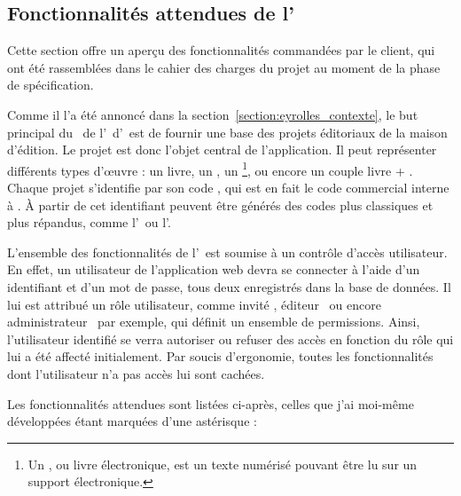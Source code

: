 \subsection{Fonctionnalités attendues de l'\aintranet}
\label{section:eyrolles_fct}

Cette section offre un aperçu des fonctionnalités commandées par le client, qui ont été rassemblées dans le cahier des charges du projet au moment de la phase de spécification.

Comme il l'a été annoncé dans la section~\ref{section:eyrolles_contexte}, le but principal du \alotdeux\ de l'\aintranet\ d'\aey\ est de fournir une base des projets éditoriaux de la maison d'édition. Le projet est donc l'objet central de l'application. Il peut représenter différents types d'œuvre : un livre, un \advd, un \aebook\footnote{Un \aebook, ou livre électronique, est un texte numérisé pouvant être lu sur un support électronique.\cite{ebook}}, ou encore un couple livre + \aebook. Chaque projet s'identifie par son code \ageodif, qui est en fait le code commercial interne à \aey. À partir de cet identifiant peuvent être générés des codes plus classiques et plus répandus, comme l'\aisbn\ ou l'\aean.

L'ensemble des fonctionnalités de l'\aintranet\ est soumise à un contrôle d'accès utilisateur. En effet, un utilisateur de l'application web devra se connecter à l'aide d'un identifiant et d'un mot de passe, tous deux enregistrés dans la base de données. Il lui est attribué un rôle utilisateur, comme \og invité \fg, \og éditeur \fg\ ou encore \og administrateur \fg\ par exemple, qui définit un ensemble de permissions. Ainsi, l'utilisateur identifié se verra autoriser ou refuser des accès en fonction du rôle qui lui a été affecté initialement. Par soucis d'ergonomie, toutes les fonctionnalités dont l'utilisateur n'a pas accès lui sont cachées.

Les fonctionnalités attendues sont listées ci-après, celles que j'ai moi-même développées étant marquées d'une astérisque :

